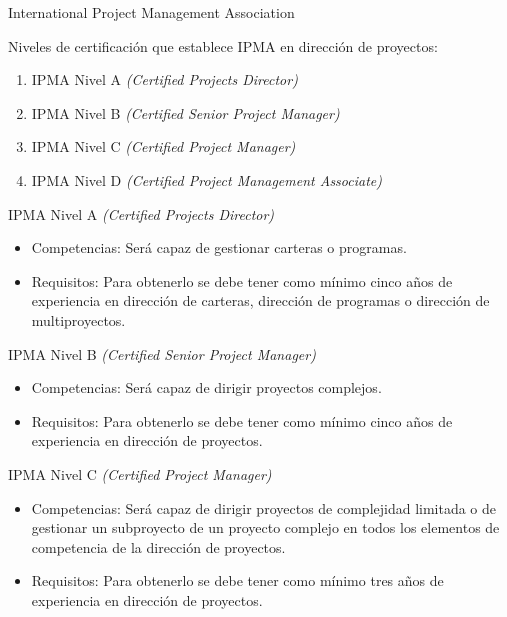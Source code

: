 \begin{frame}[allowframebreaks]{International Project Management Association}
	\framebreak
	
	Niveles de certificación que establece IPMA en dirección de proyectos:
	
	\begin{enumerate}
		\item IPMA Nivel A \emph{(Certified Projects Director)}
		\item IPMA Nivel B \emph{(Certified Senior Project Manager)}
		\item IPMA Nivel C \emph{(Certified Project Manager)}
		\item IPMA Nivel D \emph{(Certified Project Management Associate)}
	\end{enumerate}
	
	\framebreak
	
	\begin{block}{IPMA Nivel A \emph{(Certified Projects Director)}}
		\begin{itemize}
			\item Competencias: Será capaz de gestionar carteras o programas.
			\item Requisitos: Para obtenerlo se debe tener como mínimo cinco años de experiencia en dirección de carteras, dirección de programas o dirección de multiproyectos.
		\end{itemize}
	\end{block}
	
		\begin{block}{IPMA Nivel B \emph{(Certified Senior Project Manager)}}
			\begin{itemize}
				\item Competencias: Será capaz de dirigir proyectos complejos.
				\item Requisitos: Para obtenerlo se debe tener como mínimo cinco años de experiencia en dirección de proyectos.
			\end{itemize}
		\end{block}
	
	\framebreak
	
	\begin{block}{IPMA Nivel C \emph{(Certified Project Manager)}}
		\begin{itemize}
			\item Competencias: Será capaz de dirigir proyectos de complejidad limitada o de gestionar un subproyecto de un proyecto complejo en todos los elementos de competencia de la dirección de proyectos.
			\item Requisitos: Para obtenerlo se debe tener como mínimo tres años de experiencia en dirección de proyectos.
		\end{itemize}
	\end{block}
	

\end{frame}
